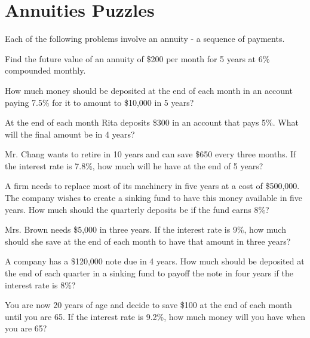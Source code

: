 \section{Annuities Puzzles}

Each of the following problems involve an annuity - a sequence of payments.

\begin{puzzle}
    Find the future value of an annuity of \$200 per month for 5 years at 6\% compounded monthly.
    \end{puzzle}
    
    \begin{puzzle}
    How much money should be deposited at the end of each month in an account paying 7.5\% for it to amount to \$10,000 in 5 years?
    \end{puzzle}
    
    \begin{puzzle}
    At the end of each month Rita deposits \$300 in an account that pays 5\%. What will the final amount be in 4 years?
    \end{puzzle}
    
    \begin{puzzle}
    Mr. Chang wants to retire in 10 years and can save \$650 every three months. If the interest rate is 7.8\%, how much will he have at the end of 5 years?
    \end{puzzle}
    
    \begin{puzzle}
    A firm needs to replace most of its machinery in five years at a cost of \$500,000. The company wishes to create a sinking fund to have this money available in five years. How much should the quarterly deposits be if the fund earns 8\%?
    \end{puzzle}
    
    \begin{puzzle}
    Mrs. Brown needs \$5,000 in three years. If the interest rate is 9\%, how much should she save at the end of each month to have that amount in three years?
    \end{puzzle}
    
    \begin{puzzle}
        A company has a \$120,000 note due in 4 years. How much should be deposited at the end of each quarter in a sinking fund to payoff the note in four years if the interest rate is 8\%?
        \end{puzzle}
        
        \begin{puzzle}
        You are now 20 years of age and decide to save \$100 at the end of each month until you are 65. If the interest rate is 9.2\%, how much money will you have when you are 65?
        \end{puzzle}
        
